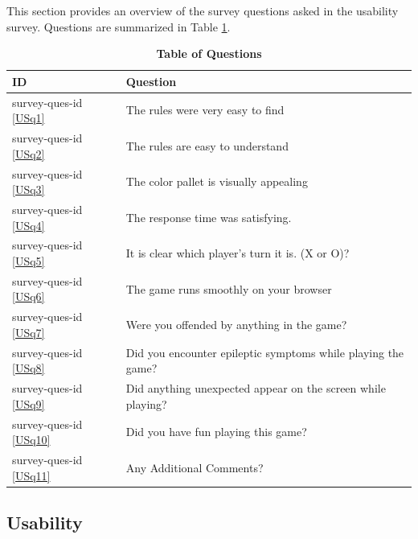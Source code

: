 \documentclass[12pt, titlepage]{article}
\newcommand{\USref}[1]{survey-ques-id \ref{#1}}
\begin{document}
This section provides an overview of the survey questions asked in the usability survey. Questions are summarized in Table \ref{TbQuestionsList}. 

\begin{table}[H]
\caption{\textbf{Table of Questions}} \label{TbQuestionsList}
\begin{tabularx}{\textwidth}{p{3.1cm}X}
\toprule
\textbf{ID} & \textbf{Question} \\
\midrule

\USref{USq1} & The rules were very easy to find \\
\USref{USq2} & The rules are easy to understand \\
\USref{USq3} & The color pallet is visually appealing \\
\USref{USq4} & The response time was satisfying.\\
\USref{USq5} & It is clear which player's turn it is. (X or O)?\\
\USref{USq6} & The game runs smoothly on your browser\\
\USref{USq7} & Were you offended by anything in the game?\\
\USref{USq8} & Did you encounter epileptic symptoms while playing the game?\\
\USref{USq9} & Did anything unexpected appear on the screen while playing?\\
\USref{USq10} & Did you have fun playing this game?\\
\USref{USq11} & Any Additional Comments?\\


\bottomrule
\end{tabularx}
\end{table}

\subsection{Usability}
\end{document}
